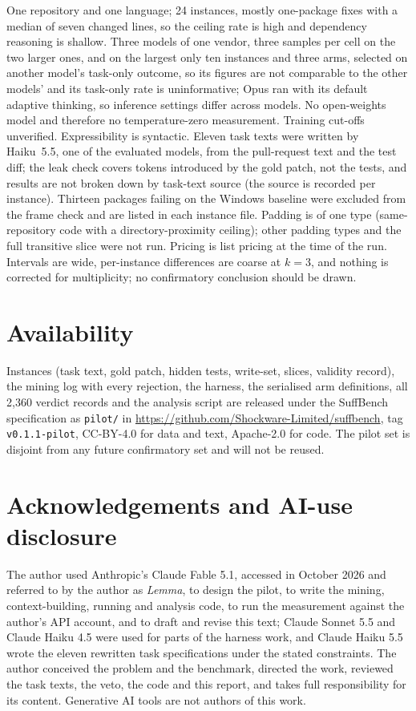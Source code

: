 \documentclass[10pt]{article}
\begin{document}
One repository and one language; 24 instances, mostly one-package fixes with a median of seven changed lines, so the ceiling rate is high and dependency reasoning is shallow. Three models of one vendor, three samples per cell on the two larger ones, and on the largest only ten instances and three arms, selected on another model's task-only outcome, so its figures are not comparable to the other models' and its task-only rate is uninformative; Opus ran with its default adaptive thinking, so inference settings differ across models. No open-weights model and therefore no temperature-zero measurement. Training cut-offs unverified. Expressibility is syntactic. Eleven task texts were written by Haiku~5.5, one of the evaluated models, from the pull-request text and the test diff; the leak check covers tokens introduced by the gold patch, not the tests, and results are not broken down by task-text source (the source is recorded per instance). Thirteen packages failing on the Windows baseline were excluded from the frame check and are listed in each instance file. Padding is of one type (same-repository code with a directory-proximity ceiling); other padding types and the full transitive slice were not run. Pricing is list pricing at the time of the run. Intervals are wide, per-instance differences are coarse at $k=3$, and nothing is corrected for multiplicity; no confirmatory conclusion should be drawn.

\section{Availability}

Instances (task text, gold patch, hidden tests, write-set, slices, validity record), the mining log with every rejection, the harness, the serialised arm definitions, all 2,360 verdict records and the analysis script are released under the SuffBench specification as \texttt{pilot/} in \url{https://github.com/Shockware-Limited/suffbench}, tag \texttt{v0.1.1-pilot}, CC-BY-4.0 for data and text, Apache-2.0 for code. The pilot set is disjoint from any future confirmatory set and will not be reused.

\section*{Acknowledgements and AI-use disclosure}

The author used Anthropic's Claude Fable 5.1, accessed in October 2026 and referred to by the author as \emph{Lemma}, to design the pilot, to write the mining, context-building, running and analysis code, to run the measurement against the author's API account, and to draft and revise this text; Claude Sonnet 5.5 and Claude Haiku 4.5 were used for parts of the harness work, and Claude Haiku 5.5 wrote the eleven rewritten task specifications under the stated constraints. The author conceived the problem and the benchmark, directed the work, reviewed the task texts, the veto, the code and this report, and takes full responsibility for its content. Generative AI tools are not authors of this work.



\end{document}
